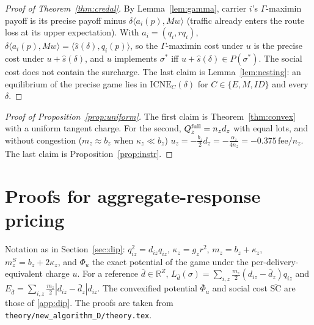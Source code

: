\documentclass[preprint,12pt]{elsarticle}
\theoremstyle{definition}
\theoremstyle{remark}
\newcommand{\R}{\mathbb{R}}
\newcommand{\ICNE}{\mathrm{ICNE}}
\newcommand{\ip}[2]{\langle #1,#2\rangle}
\begin{document}
\begin{proof}[Proof of Theorem~\ref{thm:credal}]
By Lemma~\ref{lem:gamma}, carrier $i$'s $\Gamma$-maximin payoff is its precise payoff minus $\delta\ip{a_i(p)}{Mw}$ (traffic already enters the route loss at its upper expectation). With $a_i=(q_i,rq_i)$, $\delta\ip{a_i(p)}{Mw}=\ip{\hat s(\delta)}{q_i(p)}$, so the $\Gamma$-maximin cost under $u$ is the precise cost under $u+\hat s(\delta)$, and $u$ implements $\sigma^*$ iff $u+\hat s(\delta)\in P(\sigma^*)$. The social cost does not contain the surcharge. The last claim is Lemma~\ref{lem:nesting}: an equilibrium of the precise game lies in $\ICNE_C(\delta)$ for $C\in\{E,M,ID\}$ and every $\delta$.
\end{proof}

\begin{proof}[Proof of Proposition~\ref{prop:uniform}]
The first claim is Theorem~\ref{thm:convex} with a uniform tangent charge. For the second, $Q^{\rm full}_z=n_zd_z$ with equal lots, and without congestion ($m_z\approx b_z$ when $\kappa_z\ll b_z$) $u_z=-\tfrac{b_z}{2}d_z=-\tfrac{\alpha_z}{4n_z}=-0.375\,\mathrm{fee}/n_z$. The last claim is Proposition~\ref{prop:instr}.
\end{proof}

\section{Proofs for aggregate-response pricing}\label{app:arp}

Notation as in Section~\ref{sec:dip}: $q_{iz}^2=d_{iz}q_{iz}$, $\kappa_z=g_zr^2$, $m_z=b_z+\kappa_z$, $m^S_z=b_z+2\kappa_z$, and $\Phi_u$ the exact potential of the game under the per-delivery-equivalent charge $u$. For a reference $\bar d\in\R^Z$, $L_{\bar d}(\sigma)=\sum_{i,z}\tfrac{m_z}{2}(d_{iz}-\bar d_z)q_{iz}$ and $E_{\bar d}=\sum_{i,z}\tfrac{m_z}{2}|d_{iz}-\bar d_z|d_{iz}$. The convexified potential $\overline\Phi_u$ and social cost $\overline{\mathrm{SC}}$ are those of \ref{app:dip}. The proofs are taken from \texttt{theory/new\_algorithm\_D/theory.tex}.
\end{document}
